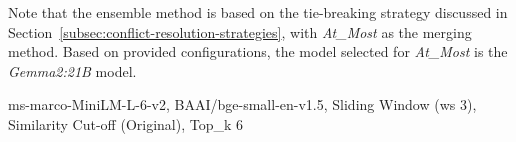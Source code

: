 Note that the ensemble method is based on the tie-breaking strategy discussed in Section~\ref{subsec:conflict-resolution-strategies}, with \textit{At\_Most} as the merging method.
Based on provided configurations, the model selected for \textit{At\_Most} is the \textit{Gemma2:21B} model.

\begin{table}
    \noindent
    {\scriptsize ms-marco-MiniLM-L-6-v2, BAAI/bge-small-en-v1.5, Sliding Window (ws 3), Similarity Cut-off (Original), Top\_k 6}
\end{table}
